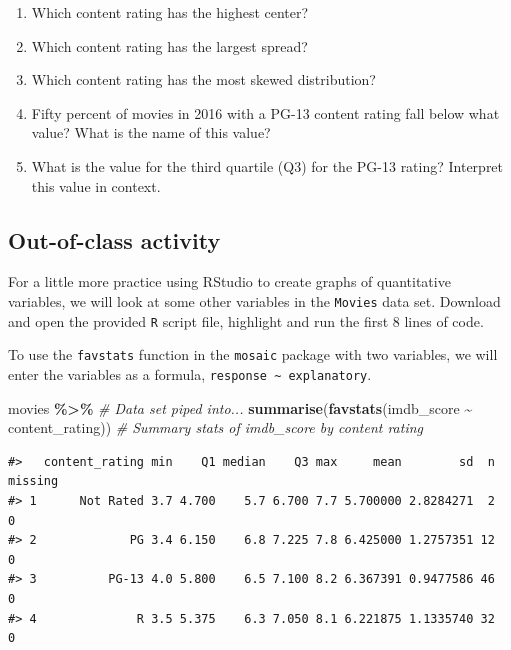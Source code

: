 \documentclass[
]{report}
\newenvironment{Shaded}{\begin{snugshade}}{\end{snugshade}}
\newcommand{\CommentTok}[1]{\textcolor[rgb]{0.56,0.35,0.01}{\textit{#1}}}
\newcommand{\KeywordTok}[1]{\textcolor[rgb]{0.13,0.29,0.53}{\textbf{#1}}}
\newcommand{\NormalTok}[1]{#1}
\newcommand{\OperatorTok}[1]{\textcolor[rgb]{0.81,0.36,0.00}{\textbf{#1}}}
\newcommand{\StringTok}[1]{\textcolor[rgb]{0.31,0.60,0.02}{#1}}
\begin{document}
\begin{enumerate}
\def\labelenumi{\alph{enumi}.}
\item
  Which content rating has the highest center?
  \vspace{0.2in}
\item
  Which content rating has the largest spread?
  \vspace{0.2in}
\item
  Which content rating has the most skewed distribution?
  \vspace{0.2in}
\item
  Fifty percent of movies in 2016 with a PG-13 content rating fall below what value? What is the name of this value?
  \vspace{0.4in}
\item
  What is the value for the third quartile (Q3) for the PG-13 rating? Interpret this value in context.
  \vspace{.8in}
\end{enumerate}

\newpage

\hypertarget{out-of-class-activity-3}{%
\subsection{Out-of-class activity}\label{out-of-class-activity-3}}

For a little more practice using RStudio to create graphs of quantitative variables, we will look at some other variables in the \texttt{Movies} data set. Download and open the provided \texttt{R} script file, highlight and run the first 8 lines of code.

To use the \texttt{favstats} function in the \texttt{mosaic} package with two variables, we will enter the variables as a formula, \texttt{response\ \textasciitilde{}\ explanatory}.

\begin{Shaded}
\begin{Highlighting}[]
\NormalTok{movies }\OperatorTok{\%\textgreater{}\%}\StringTok{ }\CommentTok{\# Data set piped into...}
\StringTok{  }\KeywordTok{summarise}\NormalTok{(}\KeywordTok{favstats}\NormalTok{(imdb\_score }\OperatorTok{\textasciitilde{}}\StringTok{ }\NormalTok{content\_rating)) }\CommentTok{\# Summary stats of imdb\_score by content rating}
\end{Highlighting}
\end{Shaded}

\begin{verbatim}
#>   content_rating min    Q1 median    Q3 max     mean        sd  n missing
#> 1      Not Rated 3.7 4.700    5.7 6.700 7.7 5.700000 2.8284271  2       0
#> 2             PG 3.4 6.150    6.8 7.225 7.8 6.425000 1.2757351 12       0
#> 3          PG-13 4.0 5.800    6.5 7.100 8.2 6.367391 0.9477586 46       0
#> 4              R 3.5 5.375    6.3 7.050 8.1 6.221875 1.1335740 32       0
\end{verbatim}
\end{document}
